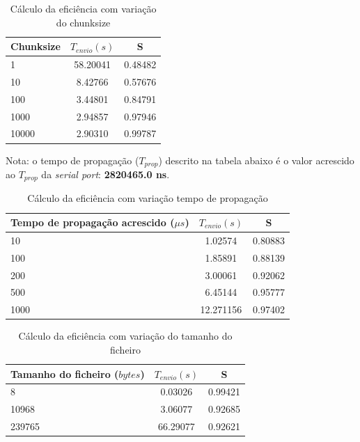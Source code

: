 \documentclass[11pt]{report}
\begin{document}
\begin{table}[h!]
  \begin{center}
    \caption{Cálculo da eficiência com variação do chunksize}
    \label{tab:table1}
    \begin{tabular}{l|c|c} %
        Chunksize & \textbf{$  T_{envio} (s) $} & S \\
      \hline
        1 & 58.20041 & 0.48482 \\
        10 & 8.42766 & 0.57676\\
        100 & 3.44801 & 0.84791\\
        1000 & 2.94857 & 0.97946\\
        10000 & 2.90310 & 0.99787\\
    \end{tabular}
  \end{center}
\end{table}

Nota: o tempo de propagação ($T_{prop}$) descrito na tabela abaixo é o valor
acrescido ao $T_{prop}$ da \textit{serial port}: \textbf{2820465.0 ns}.
\begin{table}[h!]
  \begin{center}
    \caption{Cálculo da eficiência com variação tempo de propagação}
    \label{tab:table1}
    \begin{tabular}{l|c|c} %
        Tempo de propagação acrescido ($\mu s$) & \textbf{$  T_{envio} (s) $} & S \\
      \hline
        10 & 1.02574 & 0.80883\\
        100 & 1.85891 & 0.88139\\
        200 & 3.00061 & 0.92062\\
        500 & 6.45144 & 0.95777\\
        1000 & 12.271156 & 0.97402\\
    \end{tabular}
  \end{center}
\end{table}

\begin{table}[h!]
  \begin{center}
    \caption{Cálculo da eficiência com variação do tamanho do ficheiro}
    \label{tab:table1}
    \begin{tabular}{l|c|c} %
        Tamanho do ficheiro ($bytes$) & \textbf{$  T_{envio} (s) $} & S\\
      \hline
        8 & 0.03026 & 0.99421\\
        10968 & 3.06077 & 0.92685\\
        239765 & 66.29077 & 0.92621\\
    \end{tabular}
  \end{center}
\end{table}
\end{document}
